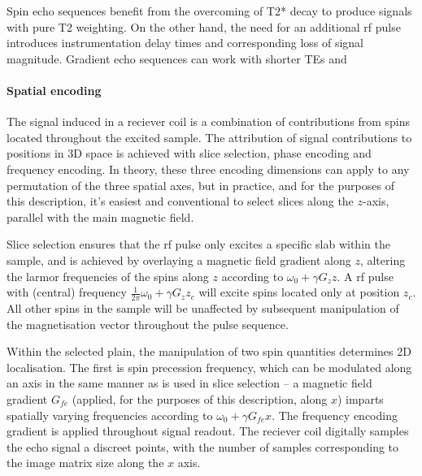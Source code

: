 Spin echo sequences benefit from the overcoming of T2* decay to produce signals with pure T2 weighting. 
On the other hand, the need for an additional \gls{rf} pulse introduces instrumentation delay times and corresponding loss of signal magnitude.
Gradient echo sequences can work with shorter TEs  and 


\paragraph*{Spatial encoding}

The signal induced in a reciever coil is a combination of contributions from spins located throughout the excited sample.
The attribution of signal contributions to positions in 3D space is achieved with slice selection, phase encoding and frequency encoding.
In theory, these three encoding dimensions can apply to any permutation of the three spatial axes, but in practice, and for the purposes of this description, it's easiest and conventional to select slices along the $z$-axis, parallel with the main magnetic field. 


Slice selection ensures that the \gls{rf} pulse only excites a specific slab within the sample, and is achieved by overlaying a magnetic field gradient along $z$, altering the larmor frequencies of the spins along $z$ according to $\omega_0 + \gamma G_zz$.
A \gls{rf} pulse with (central) frequency $\frac{1}{2\pi}\omega_0 + \gamma G_zz_c$  will excite spins located only at position $z_c$.
All other spins in the sample will be unaffected by subsequent manipulation of the magnetisation vector throughout the pulse sequence.

Within the selected plain, the manipulation of two spin quantities determines 2D localisation.
The first is spin precession frequency, which can be modulated along an axis in the same manner as is used in slice selection -- a magnetic field gradient $G_{fe}$ (applied, for the purposes of this description, along $x$) imparts spatially varying frequencies according to $\omega_0 + \gamma G_{fe}x$.
The frequency encoding gradient is applied throughout signal readout. 
The reciever coil digitally samples the echo signal a discreet points, with the number of samples corresponding to the image matrix size along the $x$ axis.

